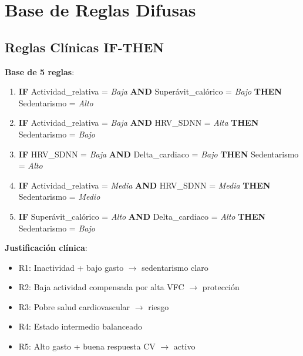 \documentclass[12pt,letterpaper,twoside]{report}
\begin{document}
\section{Base de Reglas Difusas}

\subsection{Reglas Clínicas IF-THEN}

\begin{reglabox}
\textbf{Base de 5 reglas}:

\begin{enumerate}[label=\textbf{R\arabic*:}]
    \item \textbf{IF} Actividad\_relativa = \textit{Baja} \textbf{AND} Superávit\_calórico = \textit{Bajo} \textbf{THEN} Sedentarismo = \textit{Alto}
    
    \item \textbf{IF} Actividad\_relativa = \textit{Baja} \textbf{AND} HRV\_SDNN = \textit{Alta} \textbf{THEN} Sedentarismo = \textit{Bajo}
    
    \item \textbf{IF} HRV\_SDNN = \textit{Baja} \textbf{AND} Delta\_cardiaco = \textit{Bajo} \textbf{THEN} Sedentarismo = \textit{Alto}
    
    \item \textbf{IF} Actividad\_relativa = \textit{Media} \textbf{AND} HRV\_SDNN = \textit{Media} \textbf{THEN} Sedentarismo = \textit{Medio}
    
    \item \textbf{IF} Superávit\_calórico = \textit{Alto} \textbf{AND} Delta\_cardiaco = \textit{Alto} \textbf{THEN} Sedentarismo = \textit{Bajo}
\end{enumerate}

\textbf{Justificación clínica}:
\begin{itemize}[noitemsep]
    \item R1: Inactividad + bajo gasto $\to$ sedentarismo claro
    \item R2: Baja actividad compensada por alta VFC $\to$ protección
    \item R3: Pobre salud cardiovascular $\to$ riesgo
    \item R4: Estado intermedio balanceado
    \item R5: Alto gasto + buena respuesta CV $\to$ activo
\end{itemize}
\end{reglabox}
\end{document}
